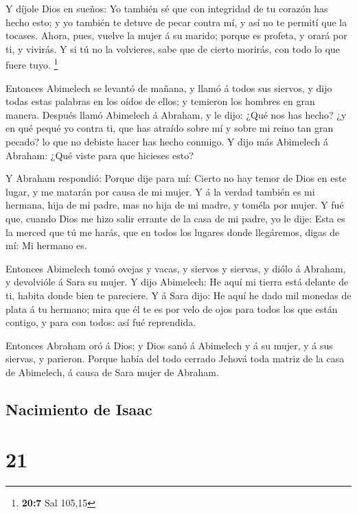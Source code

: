  Y díjole Dios en sueños: Yo también sé que con integridad
de tu corazón has hecho esto; y yo también te detuve de pecar contra mí,
y así no te permití que la tocases.  Ahora, pues, vuelve la
mujer á su marido; porque es profeta, y orará por ti, y vivirás. Y si tú
no la volvieres, sabe que de cierto morirás, con todo lo que fuere tuyo.
\footnote{\textbf{20:7} Sal 105,15}

 Entonces Abimelech se levantó de mañana, y llamó á todos
sus siervos, y dijo todas estas palabras en los oídos de ellos; y
temieron los hombres en gran manera.  Después llamó
Abimelech á Abraham, y le dijo: ¿Qué nos has hecho? ¿y en qué pequé yo
contra ti, que has atraído sobre mí y sobre mi reino tan gran pecado? lo
que no debiste hacer has hecho conmigo.  Y dijo más
Abimelech á Abraham: ¿Qué viste para que hicieses esto?

 Y Abraham respondió: Porque dije para mí: Cierto no hay
temor de Dios en este lugar, y me matarán por causa de mi mujer.
 Y á la verdad también es mi hermana, hija de mi padre, mas
no hija de mi madre, y toméla por mujer.  Y fué que, cuando
Dios me hizo salir errante de la casa de mi padre, yo le dije: Esta es
la merced que tú me harás, que en todos los lugares donde llegáremos,
digas de mí: Mi hermano es.

 Entonces Abimelech tomó ovejas y vacas, y siervos y
siervas, y diólo á Abraham, y devolvióle á Sara su mujer. 
Y dijo Abimelech: He aquí mi tierra está delante de ti, habita donde
bien te pareciere.  Y á Sara dijo: He aquí he dado mil
monedas de plata á tu hermano; mira que él te es por velo de ojos para
todos los que están contigo, y para con todos: así fué reprendida.

 Entonces Abraham oró á Dios; y Dios sanó á Abimelech y á
su mujer, y á sus siervas, y parieron.  Porque había del
todo cerrado Jehová toda matriz de la casa de Abimelech, á causa de Sara
mujer de Abraham.

\hypertarget{nacimiento-de-isaac}{%
\subsection{Nacimiento de Isaac}\label{nacimiento-de-isaac}}

\hypertarget{section-20}{%
\section{21}\label{section-20}}

